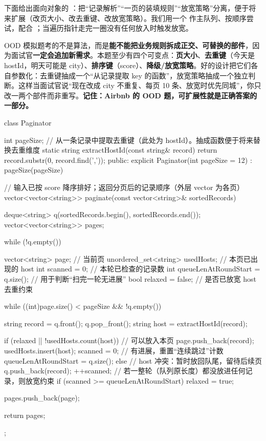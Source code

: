 下面给出面向对象的 ：把“记录解析”“一页的装填规则”“放宽策略”分离，便于将来扩展（改页大小、改去重键、改放宽策略）。我们用一个  作主队列、按顺序尝试，配合 ；当遍历指针走完一圈没有任何放入时触发放宽。

\begin{idea}
OOD 模拟题考的不是算法，而是\textbf{能不能把业务规则拆成正交、可替换的部件}，因为面试官\textbf{一定会追加新需求}。本题至少有四个可变点：\textbf{页大小}、\textbf{去重键}（今天是 hostId，明天可能是 city）、\textbf{排序键}（score）、\textbf{降级/放宽策略}。好的设计把它们各自参数化：去重键抽成一个“从记录提取 key 的函数”，放宽策略抽成一个独立判断。这样当面试官说“现在改成 city 不重复、每页 10 条、放宽时优先同城”，你只改一两个部件而非重写。\textbf{记住：Airbnb 的 OOD 题，可扩展性就是正确答案的一部分。}
\end{idea}

\begin{cpp}
class Paginator {
    int pageSize;
    // 从一条记录中提取去重键（此处为 hostId）。抽成函数便于将来替换去重维度
    static string extractHostId(const string& record) {
        return record.substr(0, record.find(','));
    }
public:
    explicit Paginator(int pageSize = 12) : pageSize(pageSize) {}

    // 输入已按 score 降序排好；返回分页后的记录顺序（外层 vector 为各页）
    vector<vector<string>> paginate(const vector<string>& sortedRecords) {
        deque<string> q(sortedRecords.begin(), sortedRecords.end());
        vector<vector<string>> pages;

        while (!q.empty()) {
            vector<string> page;                  // 当前页
            unordered_set<string> usedHosts;      // 本页已出现的 host
            int scanned = 0;                      // 本轮已检查的记录数
            int queueLenAtRoundStart = q.size();  // 用于判断“扫完一轮无进展”
            bool relaxed = false;                 // 是否已放宽 host 去重约束

            while ((int)page.size() < pageSize && !q.empty()) {
                string record = q.front(); q.pop_front();
                string host = extractHostId(record);

                if (relaxed || !usedHosts.count(host)) {
                    // 可以放入本页
                    page.push_back(record);
                    usedHosts.insert(host);
                    scanned = 0;                  // 有进展，重置“连续跳过”计数
                    queueLenAtRoundStart = q.size();
                } else {
                    // host 冲突：暂时放回队尾，留待后续页
                    q.push_back(record);
                    ++scanned;
                    // 若一整轮（队列原长度）都没放进任何记录，则放宽约束
                    if (scanned >= queueLenAtRoundStart)
                        relaxed = true;
                }
            }
            pages.push_back(page);
        }
        return pages;
    }
};
\end{cpp}

